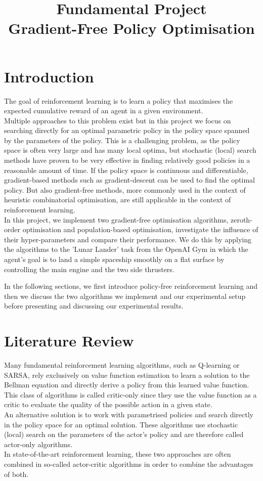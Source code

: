 \documentclass[10pt]{article}
\title{Fundamental Project\\\LARGE Gradient-Free Policy Optimisation}
\begin{document}
\maketitle

\section{Introduction}
The goal of reinforcement learning is to learn a policy that maximises the expected
cumulative reward of an agent in a given environment.\\
Multiple approaches to this problem exist but in this project we focus on searching
directly for an optimal parametric policy in the policy space spanned by the parameters
of the policy.
This is a challenging problem, as the policy space is often very large and has many local
optima, but stochastic (local) search methods have proven to be very effective in finding
relatively good policies in a reasonable amount of time.
If the policy space is continuous and differentiable, gradient-based methods such as
gradient-descent can be used to find the optimal policy.
But also gradient-free methods, more commonly used in the context of heuristic
combinatorial optimisation, are still applicable in the context of reinforcement
learning.\\
In this project, we implement two gradient-free optimisation algorithms, zeroth-order
optimisation and population-based optimisation, investigate the influence of their
hyper-parameters and compare their performance.
We do this by applying the algorithms to the 'Lunar Lander' task from the OpenAI Gym
\cite{gym} in which the agent's goal is to land a simple spaceship smoothly on a flat
surface by controlling the main engine and the two side thrusters.

In the following sections, we first introduce policy-free reinforcement learning and then
we discuss the two algorithms we implement and our experimental setup before presenting
and discussing our experimental results.

\section{Literature Review}

Many fundamental reinforcement learning algorithms, such as Q-learning or SARSA, rely
exclusively on value function estimation to learn a solution to the Bellman equation and
directly derive a policy from this learned value function.
This class of algorithms is called critic-only since they use the value function as a
critic to evaluate the quality of the possible action in a given state.\\
An alternative solution is to work with parametrised policies and search directly in the
policy space for an optimal solution.
These algorithms use stochastic (local) search on the parameters of the actor's policy
and are therefore called actor-only algorithms.\\
In state-of-the-art reinforcement learning, these two approaches are often combined in
so-called actor-critic algorithms in order to combine the advantages of both.
\cite{slides}
\end{document}
